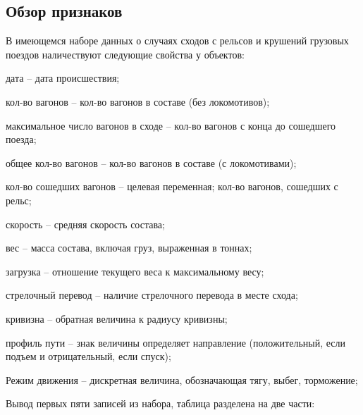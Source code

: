 \subsection{Обзор признаков}
В имеющемся наборе данных о случаях сходов с рельсов и крушений грузовых поездов наличествуют следующие свойства у объектов:
\begin{description}[font=$\bullet$]
\item дата --  дата происшествия;
\item кол-во вагонов -- кол-во вагонов в составе (без локомотивов);
\item максимальное число вагонов в сходе -- кол-во вагонов с конца до сошедшего поезда;
\item общее кол-во вагонов -- кол-во вагонов в составе (с локомотивами);
\item кол-во сошедших вагонов -- целевая переменная; кол-во вагонов, сошедших с рельс;
\item скорость -- средняя скорость состава;
\item вес -- масса состава, включая груз, выраженная в тоннах;
\item загрузка -- отношение текущего веса к максимальному весу;
\item стрелочный перевод -- наличие стрелочного перевода в месте схода;
\item кривизна -- обратная величина к радиусу кривизны;
\item профиль пути -- знак величины определяет направление (положительный, если подъем и отрицательный, если спуск);
\item Режим движения -- дискретная величина, обозначающая тягу, выбег, торможение;\\
\end{description}
Вывод первых пяти записей из набора, таблица разделена на две части:
\label{tab:first_5_records}


